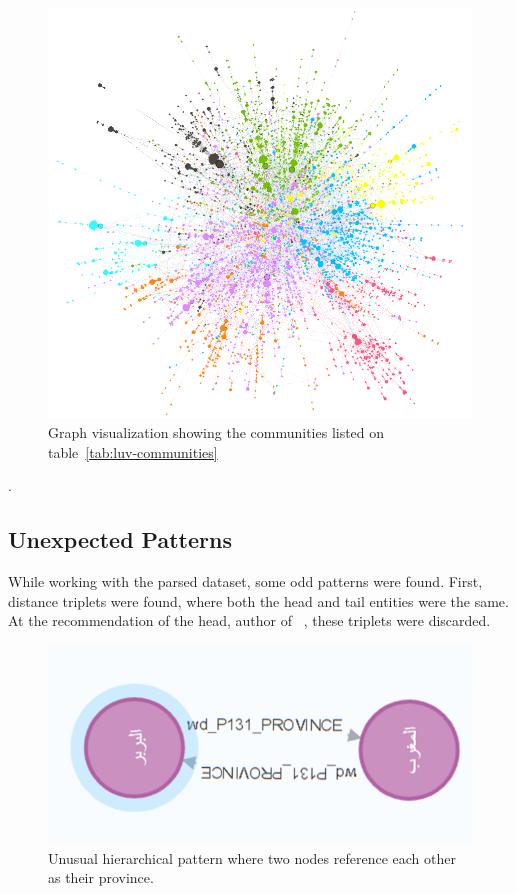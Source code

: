 \begin{figure}[h] %
    \centering %
    \includegraphics[width=0.7\linewidth]{figures/modules} %
    \caption{Graph visualization showing the communities listed on table~\ref{tab:luv-communities}} %
    \label{fig:communities} %
\end{figure}.

\subsection{Unexpected Patterns}\label{subsec:odd-patterns}
While working with the parsed dataset, some odd patterns were found.
First, distance triplets were found, where both the head and tail entities were the same.
At the recommendation of the head, author of ~\cite{YaqutRB}, these triplets were discarded.

\begin{figure}[h] %
    \centering %
    \includegraphics[width=0.5\linewidth]{figures/odd1} %
    \caption{Unusual hierarchical pattern where two nodes reference each other as their province.} %
    \label{fig:odd1} %
\end{figure}

